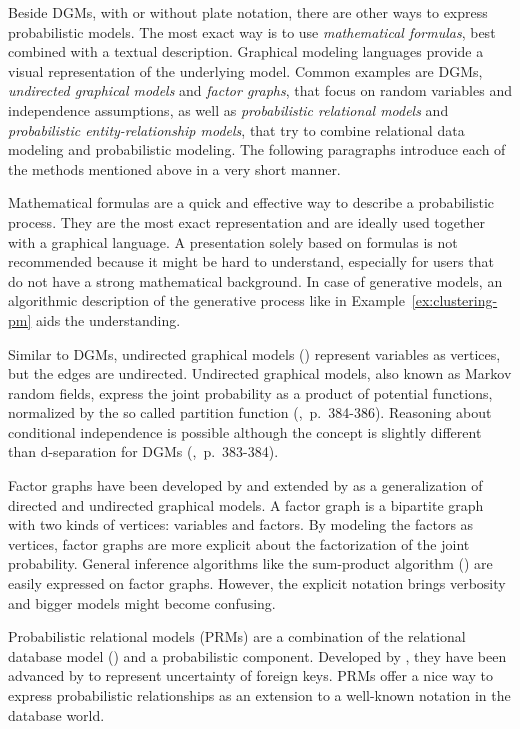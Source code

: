 Beside DGMs, with or without plate notation, there are other ways to express probabilistic models. The most exact way is to use \emph{mathematical formulas}, best combined with a textual description. Graphical modeling languages provide a visual representation of the underlying model. Common examples are DGMs, \emph{undirected graphical models} and \emph{factor graphs}, that focus on random variables and independence assumptions, as well as \emph{probabilistic relational models} and \emph{probabilistic entity-relationship models}, that try to combine relational data modeling and probabilistic modeling. The following paragraphs introduce each of the methods mentioned above in a very short manner.

Mathematical formulas are a quick and effective way to describe a probabilistic process. They are the most exact representation and are ideally used together with a graphical language. A presentation solely based on formulas is not recommended because it might be hard to understand, especially for users that do not have a strong mathematical background. In case of generative models, an algorithmic description of the generative process like in Example~\ref{ex:clustering-pm} aids the understanding. 

Similar to DGMs, undirected graphical models (\cite{kindermann1980markov}) represent variables as vertices, but the edges are undirected. Undirected graphical models, also known as Markov random fields, express the joint probability as a product of potential functions, normalized by the so called partition function (\cite{bishop2006pattern},~p.~384-386). Reasoning about conditional independence is possible although the concept is slightly different than d-separation for DGMs (\cite{bishop2006pattern},~p.~383-384).

Factor graphs have been developed by \textcite{kschischang2001factor} and extended by \textcite{frey2002extending} as a generalization of directed and undirected graphical models. A factor graph is a bipartite graph with two kinds of vertices: variables and factors. By modeling the factors as vertices, factor graphs are more explicit about the factorization of the joint probability. General inference algorithms like the sum-product algorithm (\cite{pearl1988probabilistic}) are easily expressed on factor graphs. However, the explicit notation brings verbosity and bigger models might become confusing.

Probabilistic relational models (PRMs) are a combination of the relational database model (\cite{codd1970relational}) and a probabilistic component. Developed by \textcite{friedman1999learning}, they have been advanced by \textcite{getoor2003learning} to represent uncertainty of foreign keys. PRMs offer a nice way to express probabilistic relationships as an extension to a well-known notation in the database world.

